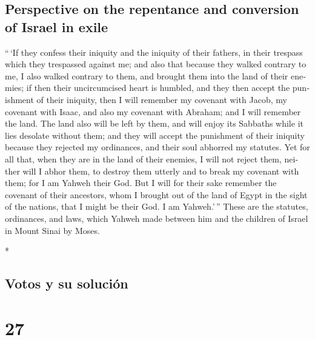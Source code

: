 \begin{paracol}{2}
\begin{otherlanguage}{english}
\hypertarget{perspective-on-the-repentance-and-conversion-of-israel-in-exile}{%
\subsection{Perspective on the repentance and conversion of Israel in
exile}\label{perspective-on-the-repentance-and-conversion-of-israel-in-exile}}

 ``\,`If they confess their iniquity and the iniquity of
their fathers, in their trespass which they trespassed against me; and
also that because they walked contrary to me,  I also
walked contrary to them, and brought them into the land of their
enemies; if then their uncircumcised heart is humbled, and they then
accept the punishment of their iniquity,  then I will
remember my covenant with Jacob, my covenant with Isaac, and also my
covenant with Abraham; and I will remember the land.  The
land also will be left by them, and will enjoy its Sabbaths while it
lies desolate without them; and they will accept the punishment of their
iniquity because they rejected my ordinances, and their soul abhorred my
statutes.  Yet for all that, when they are in the land of
their enemies, I will not reject them, neither will I abhor them, to
destroy them utterly and to break my covenant with them; for I am Yahweh
their God.  But I will for their sake remember the
covenant of their ancestors, whom I brought out of the land of Egypt in
the sight of the nations, that I might be their God. I am Yahweh.'\,''
 These are the statutes, ordinances, and laws, which
Yahweh made between him and the children of Israel in Mount Sinai by
Moses.

\end{otherlanguage}

\switchcolumn[0]*

\hypertarget{votos-y-su-soluciuxf3n}{%
\subsection{Votos y su solución}\label{votos-y-su-soluciuxf3n}}

\hypertarget{section-52}{%
\section{27}\label{section-52}}


\end{paracol}
